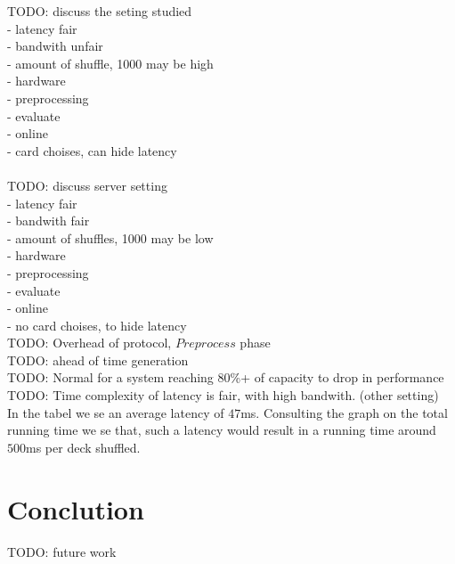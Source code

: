 \documentclass[twoside,11pt,openright]{report}
\newcommand{\todo}[1]{}
\renewcommand{\todo}[1]{{\color{red} TODO: {#1}} \\}
\begin{document}
\todo{
discuss the seting studied\\
- latency fair\\
- bandwith unfair\\
- amount of shuffle, 1000 may be high\\
- hardware\\
- preprocessing\\
- evaluate\\
- online\\
- card choises, can hide latency\\}

\todo{discuss server setting\\
- latency fair\\
- bandwith fair\\
- amount of shuffles, 1000 may be low\\
- hardware\\
- preprocessing\\
- evaluate\\
- online\\
- no card choises, to hide latency}

\todo{Overhead of protocol, $Preprocess$ phase}
\todo{ahead of time generation}

\todo{Normal for a system reaching 80\%+ of capacity to drop in performance}

\todo{Time complexity of latency is fair, with high bandwith. (other setting)}
In the tabel we se an average latency of $47$ms. Consulting the graph on the total running time we se that, such a latency would result in a running time around $500$ms per deck shuffled.  



\chapter{Conclution}
\label{ch:conclution}

\todo{future work}

\end{document}
